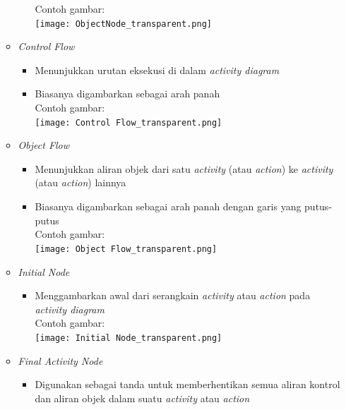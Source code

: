 \documentclass[a4paper]{article}
\begin{document}
\begin{enumerate}
\begin{itemize}
\begin{itemize}
                  Contoh gambar:\\
                  \texttt{[image: ObjectNode\_transparent.png]}
        \end{itemize}
        \item \textit{Control Flow}
        \begin{itemize}
            \item Menunjukkan urutan eksekusi di dalam \textit{activity diagram}
            \item Biasanya digambarkan sebagai arah panah\autocite{systemanalysisdesign-activity-diagram}\\
                  Contoh gambar:\\
                  \texttt{[image: Control Flow\_transparent.png]}
        \end{itemize}
        \item \textit{Object Flow}
        \begin{itemize}
            \item Menunjukkan aliran objek dari satu \textit{activity} (atau \textit{action}) ke \textit{activity} (atau \textit{action}) lainnya
            \item Biasanya digambarkan sebagai arah panah dengan garis yang putus-putus\autocite{systemanalysisdesign-activity-diagram}\\
                  Contoh gambar:\\
                  \texttt{[image: Object Flow\_transparent.png]}
        \end{itemize}
        \item \textit{Initial Node}
        \begin{itemize}
            \item Menggambarkan awal dari serangkain \textit{activity} atau \textit{action} pada \textit{activity diagram}\autocite{systemanalysisdesign-activity-diagram}\\
                  Contoh gambar:\\
                  \texttt{[image: Initial Node\_transparent.png]}
        \end{itemize}
        \item \textit{Final Activity Node}
        \begin{itemize}
            \item Digunakan sebagai tanda untuk memberhentikan semua aliran kontrol dan aliran objek dalam suatu \textit{activity} atau \textit{action}\autocite{systemanalysisdesign-activity-diagram}\\

\end{itemize}
\end{itemize}
\end{enumerate}
\end{document}
